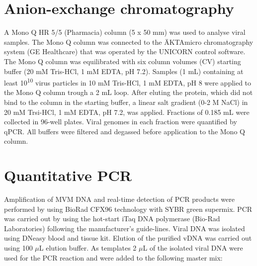 \section{Anion-exchange chromatography}
A Mono Q HR 5/5 (Pharmacia) column (5 x 50 mm) was used to analyse viral samples. The Mono Q column was connected to the ÄKTAmicro chromatography system (GE Healthcare) that was operated by the UNICORN control software. The Mono Q column was equilibrated with six column volumes (CV) starting buffer (20 mM Tris-HCl, 1 mM EDTA, pH 7.2). Samples (1 mL) containing at least 10\textsuperscript{10} virus particles in 10 mM Tris-HCl, 1 mM EDTA, pH 8 were applied to the Mono Q column trough a 2 mL loop. After eluting the protein, which did not bind to the column in the starting buffer, a linear salt gradient (0-2 M NaCl) in 20 mM Trsi-HCl, 1 mM EDTA, pH 7.2, was applied. Fractions of 0.185 mL were collected in 96-well plates. Viral genomes in each fraction were quantified by qPCR. All buffers were filtered and degassed before application to the Mono Q column. 





\section{Quantitative PCR}
Amplification of MVM DNA and real-time detection of PCR products were performed by using BioRad CFX96 technology with SYBR green supermix. PCR was carried out by using the hot-start iTaq\textsuperscript{\texttrademark} DNA polymerase (Bio-Rad Laboratories) following the manufacturer’s guide-lines. Viral DNA was isolated using DNeasy blood and tissue kit. Elution of the purified vDNA was carried out using 100 $\mu$L elution buffer. As templates 2 $\mu$L of the isolated viral DNA were used for the PCR reaction and were added to the following master mix:\\

